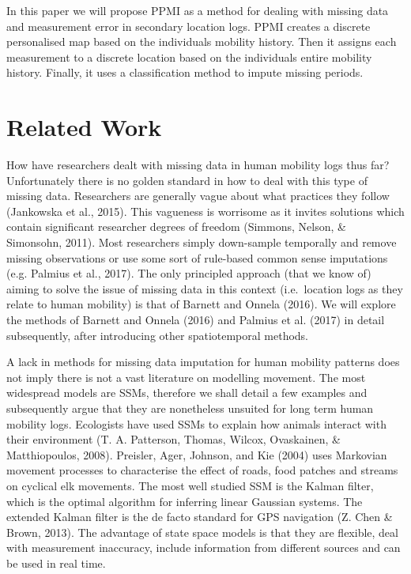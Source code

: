 \documentclass[man]{apa6}
\theoremstyle{definition}
\theoremstyle{definition}
\theoremstyle{definition}
\theoremstyle{remark}
\begin{document}
In this paper we will propose PPMI as a method for dealing with missing
data and measurement error in secondary location logs. PPMI creates a
discrete personalised map based on the individuals mobility history.
Then it assigns each measurement to a discrete location based on the
individuals entire mobility history. Finally, it uses a classification
method to impute missing periods.

\section{Related Work}\label{related-work}

How have researchers dealt with missing data in human mobility logs thus
far? Unfortunately there is no golden standard in how to deal with this
type of missing data. Researchers are generally vague about what
practices they follow (Jankowska et al., 2015). This vagueness is
worrisome as it invites solutions which contain significant researcher
degrees of freedom (Simmons, Nelson, \& Simonsohn, 2011). Most
researchers simply down-sample temporally and remove missing
observations or use some sort of rule-based common sense imputations
(e.g. Palmius et al., 2017). The only principled approach (that we know
of) aiming to solve the issue of missing data in this context
(i.e.~location logs as they relate to human mobility) is that of Barnett
and Onnela (2016). We will explore the methods of Barnett and Onnela
(2016) and Palmius et al. (2017) in detail subsequently, after
introducing other spatiotemporal methods.

A lack in methods for missing data imputation for human mobility
patterns does not imply there is not a vast literature on modelling
movement. The most widespread models are SSMs, therefore we shall detail
a few examples and subsequently argue that they are nonetheless unsuited
for long term human mobility logs. Ecologists have used SSMs to explain
how animals interact with their environment (T. A. Patterson, Thomas,
Wilcox, Ovaskainen, \& Matthiopoulos, 2008). Preisler, Ager, Johnson,
and Kie (2004) uses Markovian movement processes to characterise the
effect of roads, food patches and streams on cyclical elk movements. The
most well studied SSM is the Kalman filter, which is the optimal
algorithm for inferring linear Gaussian systems. The extended Kalman
filter is the de facto standard for GPS navigation (Z. Chen \& Brown,
2013). The advantage of state space models is that they are flexible,
deal with measurement inaccuracy, include information from different
sources and can be used in real time.
\end{document}
